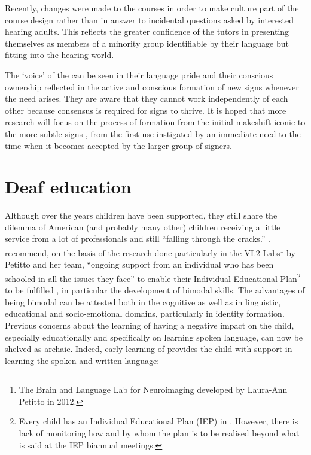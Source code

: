 \documentclass[output=paper]{langsci/langscibook}
\begin{document}
Recently, changes were made to the  courses in
order to make  culture part of the course design rather than in
answer to incidental questions asked by interested hearing adults.
This reflects the greater confidence of the  tutors in presenting
themselves as members of a minority group identifiable by their
language but fitting into the hearing world.

The ‘voice’ of the  can be seen in their language pride and their
conscious ownership reflected in the active and conscious formation of
new signs whenever the need arises.  They are aware that they cannot
work independently of each other because consensus is required for
signs to thrive.  It is hoped that more research will focus on the
process of  formation from the initial makeshift iconic  to
the more subtle signs \citep{a09}, from the
first use instigated by an immediate need to the time when it becomes
accepted by the larger group of signers.

\section{Deaf education}

Although over the years  children have been supported, they still
share the dilemma of American (and probably many other)  children
receiving a little service from a lot of professionals and still
“falling through the cracks.” \citep[198]{ol14}. \citet{ol14} recommend, on the basis of the
research done particularly in the VL2 Labs\footnote{The Brain and
  Language Lab for Neuroimaging developed by Laura-Ann Petitto in
  2012.} by Petitto and her team, “ongoing support from an individual
who has been schooled in all the issues they face” to enable their
Individual Educational Plan\footnote{Every  child has an
  Individual Educational Plan (IEP) in .  However, there is lack
  of monitoring how and by whom the plan is to be realised beyond what
  is said at the IEP biannual meetings.} to be fulfilled \citep[198]{ol14}, in particular the development of bimodal
 skills.  The advantages of being bimodal  can be
attested both in the cognitive as well as in linguistic, educational
and socio-emotional domains, particularly in identity formation.
Previous concerns about the learning of  having a
negative impact on the  child, especially educationally and
specifically on learning spoken language, can now be shelved as
archaic.  Indeed, early learning of  provides the 
child with support in learning the spoken and written language:
\end{document}
